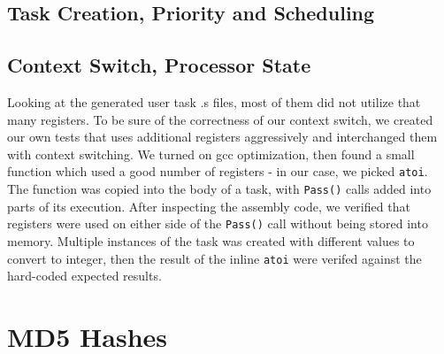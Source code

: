 \documentclass[12pt]{article}
\begin{document}
\subsection{Task Creation, Priority and Scheduling}
\subsection{Context Switch, Processor State}
Looking at the generated user task .s files, most of them did not utilize that many registers. To be sure of the correctness of our context switch, we created our own tests that uses additional registers aggressively and interchanged them with context switching. We turned on gcc optimization, then found a small function which used a good number of registers - in our case, we picked \texttt{atoi}. The function was copied into the body of a task, with \texttt{Pass()} calls added into parts of its execution. After inspecting the assembly code, we verified that registers were used on either side of the \texttt{Pass()} call without being stored into memory. Multiple instances of the task was created with different values to convert to integer, then the result of the inline \texttt{atoi} were verifed against the hard-coded expected results.
\section{MD5 Hashes}

\end{document}
